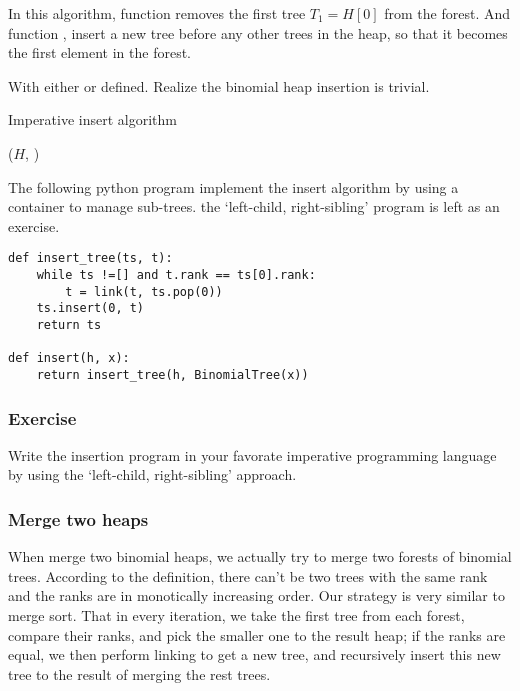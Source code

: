 \documentclass{article}
\begin{document}
In this algorithm, function  removes the first tree
$T_1 = H[0]$ from the forest. And function ,
insert a new tree before any other trees in the heap, so that it 
becomes the first element in the forest.

With either  or  defined.
Realize the binomial heap insertion is trivial.

\begin{algorithm}
\caption{Imperative insert algorithm}
\label{alg:bheap-insert}
\begin{algorithmic}[1]
  \State \Return {}($H$, )
\EndFunction
\end{algorithmic}
\end{algorithm}

The following python program implement the insert algorithm by using
a container to manage sub-trees. the `left-child, right-sibling' program
is left as an exercise.

\lstset{language=Python}
\begin{lstlisting}
def insert_tree(ts, t):
    while ts !=[] and t.rank == ts[0].rank:
        t = link(t, ts.pop(0))
    ts.insert(0, t)
    return ts

def insert(h, x):
    return insert_tree(h, BinomialTree(x))
\end{lstlisting}

\subsubsection*{Exercise}

Write the insertion program in your favorate imperative programming 
language by using the `left-child, right-sibling' approach.


\subsubsection{Merge two heaps}
When merge two binomial heaps, we actually try to merge two forests
of binomial trees. According to the definition, there can't be
two trees with the same rank and the ranks are in monotically increasing
order. Our strategy is very similar to merge sort. That in every iteration,
we take the first tree from each forest, compare their ranks, 
and pick the smaller one to the result heap; if the ranks are
equal, we then perform linking to get a new tree, and recursively
insert this new tree to the result of merging the rest trees.
\end{document}
